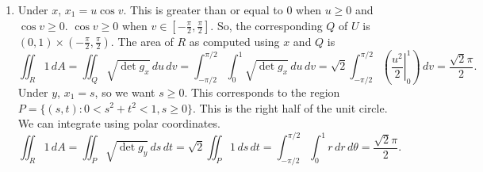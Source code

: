 \documentclass[12pt]{article}
\begin{document}
\begin{enumerate}[label=\Alph*., leftmargin=*]
\begin{equation*}
\begin{bmatrix}
        \end{bmatrix}\begin{bmatrix}
            \cos v&-u\sin v\\
            \sin v&u\cos v
        \end{bmatrix}\end{equation*} and find that \begin{equation*} \begin{bmatrix}
            \cos^2 v+\cos^4 v+2\sin^2 v\cos^2 v+\sin^2 v+\sin^4 v&0\\
            0&u^2\sin^2 v+u^2\cos^2 v
        \end{bmatrix}
    \end{equation*} This simplifies to\begin{equation*}
        \begin{bmatrix}
            {(\cos^2 v+\sin^2 v)}^2 + 1&0\\
            0&u^2
        \end{bmatrix}=\begin{bmatrix}
            2&0\\
            0&u^2
        \end{bmatrix}
    \end{equation*}
    \item Under $x$, $x_1=u\cos v$. This is greater than or equal to 0 when $u\geq 0$ and $\cos v\geq 0$. $\cos v\geq 0$ when $v\in[-\frac{\pi}{2},\frac{\pi}{2}]$. So, the corresponding $Q$ of $U$
    is $(0,1)\times(-\frac{\pi}{2},\frac{\pi}{2})$. The area of $R$ as computed using $x$ and $Q$ is\begin{equation*}
        \iint_R 1\,dA=\iint_Q \sqrt{\det g_x}\,du\,dv=\int_{-\pi/2}^{\pi/2}\int_{0}^{1}\sqrt{\det g_x}\,du\,dv=\sqrt{2}\int_{-\pi/2}^{\pi/2}(\left. \frac{u^2}{2}\right|_{0}^{1})\,dv=\frac{\sqrt{2}\pi}{2}.
    \end{equation*} Under $y$, $x_1=s$, so we want $s\geq 0$. This corresponds to the region $P=\{(s,t):0<s^2+t^2<1, s\geq 0\}$. This is the right half of the unit circle. We can integrate using polar coordinates.\begin{equation*}
        \iint_R 1\,dA=\iint_{P}\sqrt{\det g_y}\,ds\,dt=\sqrt{2}\iint_{P}1\,ds\,dt=\int_{-\pi/2}^{\pi/2}\int_{0}^{1}r\,dr\,d\theta=\frac{\sqrt{2}\pi}{2}.
    \end{equation*}
\end{enumerate} 
\end{document}
